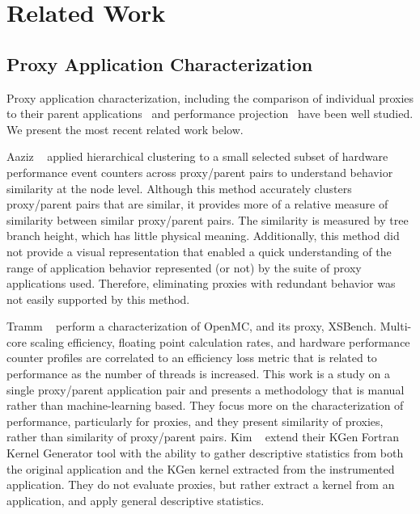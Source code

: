 \section{Related Work}
\label{sec:relatedWork}
\subsection{Proxy Application Characterization}
Proxy application characterization, including the comparison of individual proxies to their parent applications~\cite{BARRETT2015107, Islam:2016:MLF:3014904.3014966, 8049024, CPE:CPE3587} and performance projection~\cite{barrett2012navigating, sharkawi2009performance,8049025} have been well studied. We present the most recent related work below. 

Aaziz \etal~\cite{8514880} applied hierarchical clustering to a small selected subset of hardware performance event counters across proxy/parent pairs to understand behavior similarity at the node level. Although this method accurately clusters proxy/parent pairs that are similar, it provides more of a relative measure of similarity between similar proxy/parent pairs.  The similarity is measured by tree branch height, which has little physical
meaning. Additionally, this method did not provide a visual representation that enabled a quick understanding of the range of application behavior represented (or not) by the suite of proxy applications used. Therefore, eliminating proxies with redundant behavior was not easily supported by this method.

Tramm \etal~\cite{XSBench} perform a characterization of OpenMC, and its proxy, XSBench. Multi-core scaling efficiency, floating point calculation rates, and hardware performance counter profiles are correlated to an efficiency loss metric that is related to performance as the number of threads is increased.  This work is a study on a single proxy/parent application pair and presents a methodology that is manual rather than machine-learning based. They focus more on the characterization of performance, particularly for proxies, and they present similarity of proxies, rather than similarity of proxy/parent pairs.  Kim \etal~\cite{8049024} extend their KGen Fortran Kernel Generator tool with the ability to gather descriptive statistics from both the original application and the KGen kernel extracted from the instrumented application. They do not evaluate proxies, but rather extract a kernel from an application, and apply general descriptive statistics.

